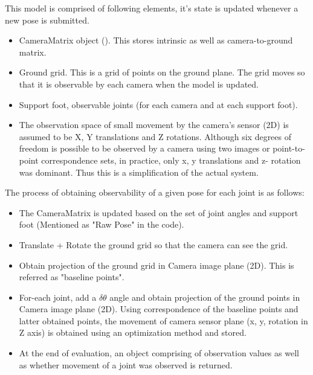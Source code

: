 \documentclass[english, printversion, nomenclature, notitle]{tuvisionthesis} %
\begin{document}
This model is comprised of following elements, it's state is updated whenever a new pose is submitted. 
\begin{itemize}
	\item CameraMatrix object ().
	\subitem This stores intrinsic as well as camera-to-ground matrix.
	\item Ground grid. This is a grid of points on the ground plane.
	\subitem The grid moves so that it is observable by each camera when the model is updated.
	\item Support foot, observable joints (for each camera and at each support foot). 
	\item The observation space of small movement by the camera's sensor (2D) is assumed to be X, Y translations and Z rotations.
	\subitem Although six degrees of freedom is possible to be observed by a camera using two images or point-to-point correspondence sets, in practice, only x, y translations and z- rotation was dominant.  Thus this is a simplification of the actual system.
\end{itemize}

The process of obtaining observability of a given pose for each joint is as follows: 
\begin{itemize}
	\item The CameraMatrix is updated based on the set of joint angles and support foot (Mentioned as "Raw Pose" in the code).
	\item Translate + Rotate the ground grid so that the camera can see the grid.
	\item Obtain projection of the ground grid in Camera image plane (2D). This is referred as "baseline points".
	\item For-each joint, add a \(\delta\theta\) angle and obtain projection of the ground points in Camera image plane (2D).
	\subitem Using correspondence of the baseline points and latter obtained points, the movement of camera sensor plane (x, y, rotation in Z axis) is obtained using an optimization method and stored.
	\item At the end of evaluation, an object comprising of observation values as well as whether movement of a joint was observed is returned.
\end{itemize}

\end{document}
